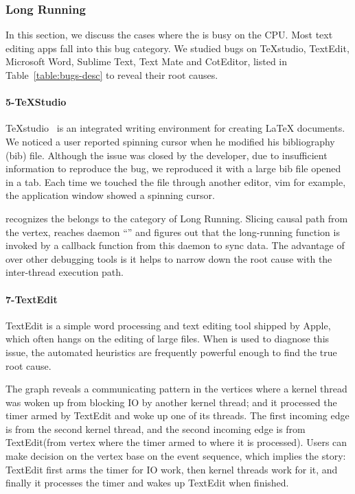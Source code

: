 \subsubsection{Long Running}

In this section, we discuss the cases where the \spinningnode is busy on the
CPU. Most text editing apps fall into this bug category. We studied bugs on
TeXstudio, TextEdit, Microsoft Word, Sublime Text, Text Mate and CotEditor,
listed in Table~\ref{table:bugs-desc} to reveal their root causes.


\paragraph{5-TeXStudio}

TeXstudio~\cite{TeXStudio} is an integrated writing environment for creating
LaTeX documents. We noticed a user reported spinning cursor when he modified
his bibliography (bib) file. Although the issue was closed by the developer,
due to insufficient information to reproduce the bug, we reproduced it with a
large bib file opened in a tab. Each time we touched the file through another
editor, vim for example, the application window showed a spinning cursor.

\xxx recognizes the \spinningnode belongs to the category of Long Running.
Slicing causal path from the vertex, \xxx reaches daemon ``'' and
figures out that the long-running function is invoked by a callback function
from this daemon to sync data. The advantage of \xxx over other debugging tools
is it helps to narrow down the root cause with the inter-thread execution path.

\paragraph{7-TextEdit}

TextEdit is a simple word processing and text editing tool shipped by Apple,
which often hangs on the editing of large files.  When \xxx is used to diagnose
this issue, the automated heuristics are frequently powerful enough to find the
true root cause.

The graph reveals a communicating pattern in the vertices where a kernel thread
was woken up from blocking IO by another kernel thread; and it processed the
timer armed by TextEdit and woke up one of its threads. The first incoming edge
is from the second kernel thread, and the second incoming edge is from
TextEdit(from vertex where the timer armed to where it is processed). Users can
make decision on the vertex base on the event sequence, which implies the
story: TextEdit first arms the timer for IO work, then kernel threads work for
it, and finally it processes the timer and wakes up TextEdit when finished.

